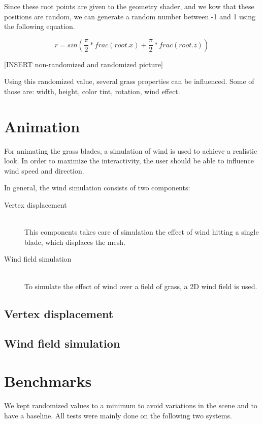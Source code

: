 \documentclass[conference]{acmsiggraph}
\begin{document}
Since these root points are given to the geometry shader, and we kow that these positions are random, we can generate a random number between -1 and 1 using the following equation.

\begin{equation}
r = sin(\frac{\pi}2 * frac(root.x) + \frac{\pi}2 * frac(root.z))
\end{equation}

[INSERT non-randomized and randomized picture]

Using this randomized value, several grass properties can be influenced. Some of those are: width, height, color tint, rotation, wind effect.

\section{Animation}
For animating the grass blades, a simulation of wind is used to achieve a realistic look. In order to maximize the interactivity, the user should be able to influence wind speed and direction. 

In general, the wind simulation consists of two components:

\begin{description}
  \item[Vertex displacement] \hfill \\
  This components takes care of simulation the effect of wind hitting a single blade, which displaces the mesh.
  \item[Wind field simulation] \hfill \\
  To simulate the effect of wind over a field of grass, a 2D wind field is used.
\end{description}

\subsection{Vertex displacement}


\subsection{Wind field simulation}

\section{Benchmarks}
We kept randomized values to a minimum to avoid variations in the scene and to have a baseline. All tests were mainly done on the following two systems.
\end{document}
